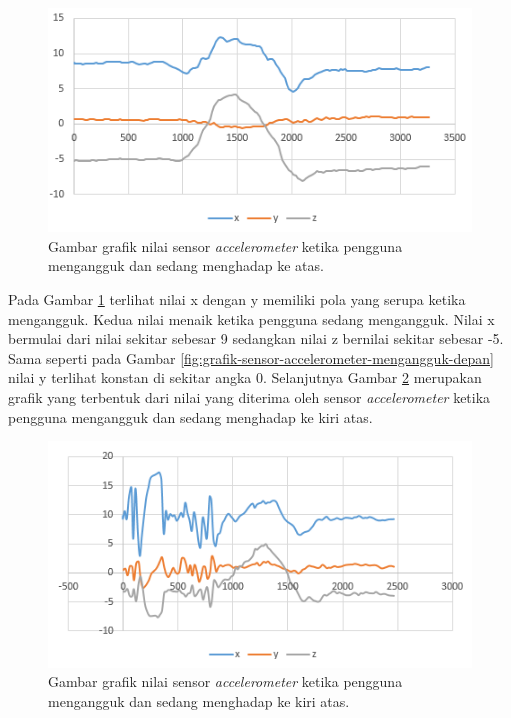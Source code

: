 \begin{figure}[htbp]
\centering
\includegraphics[scale=1]{Gambar/grafik-sensor-accelerometer-mengangguk-atas.png}
\caption{Gambar grafik nilai sensor \textit{accelerometer} ketika pengguna mengangguk dan sedang menghadap ke atas.} 
\label{fig:grafik-sensor-accelerometer-mengangguk-atas}
\end{figure}

Pada Gambar \ref{fig:grafik-sensor-accelerometer-mengangguk-atas} terlihat nilai x dengan y memiliki pola yang serupa ketika mengangguk. Kedua nilai menaik ketika pengguna sedang mengangguk. Nilai x bermulai dari nilai sekitar sebesar 9 sedangkan nilai z bernilai sekitar sebesar -5. Sama seperti pada Gambar \ref{fig:grafik-sensor-accelerometer-mengangguk-depan} nilai y terlihat konstan di sekitar angka 0. Selanjutnya Gambar \ref{fig:grafik-sensor-accelerometer-mengangguk-kiri-atas} merupakan grafik yang terbentuk dari nilai yang diterima oleh sensor \textit{accelerometer} ketika pengguna mengangguk dan sedang menghadap ke kiri atas.


\begin{figure}[htbp]
\centering
\includegraphics[scale=1]{Gambar/grafik-sensor-accelerometer-mengangguk-kiri-atas.png}
\caption{Gambar grafik nilai sensor \textit{accelerometer} ketika pengguna mengangguk dan sedang menghadap ke kiri atas.} 
\label{fig:grafik-sensor-accelerometer-mengangguk-kiri-atas}
\end{figure}

